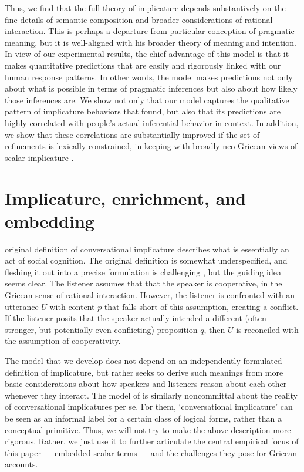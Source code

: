 \documentclass[leqno]{article}
\begin{document}
Thus, we find that the full theory of implicature depends
substantively on the fine details of semantic composition and broader
considerations of rational interaction. This is perhaps a departure
from  particular conception of pragmatic meaning,
but it is well-aligned with his broader theory of meaning and
intention.  In view of our experimental results, the chief advantage
of this model is that it makes quantitative predictions that are
easily and rigorously linked with our human response patterns. In
other words, the model makes predictions not only about what is
possible in terms of pragmatic inferences but also about how likely
those inferences are. We show not only that our model captures the
qualitative pattern of implicature behaviors that
\citeauthor{Chemla:Spector:2011} found, but also that its predictions
are highly correlated with people's actual inferential behavior in
context. In addition, we show that these correlations are
substantially improved if the set of refinements is lexically
constrained, in keeping with broadly neo-Gricean views of scalar
implicature \citep{Horn72,Gazdar79b,Gazdar79a,SchulzVanRooij06}.


\section{Implicature, enrichment, and embedding}\label{sec:implicature}

 original definition of conversational implicature
describes what is essentially an act of social cognition. The original
definition is somewhat underspecified, and fleshing it out into a
precise formulation is challenging \citep{Hirschberg85}, but the
guiding idea seems clear.  The listener assumes that that the speaker
is cooperative, in the Gricean sense of rational interaction. However,
the listener is confronted with an utterance $U$ with content $p$ that
falls short of this assumption, creating a conflict. If the listener
posits that the speaker actually intended a different (often stronger,
but potentially even conflicting) proposition $q$, then $U$ is
reconciled with the assumption of cooperativity.

The model that we develop does not depend on an independently
formulated definition of implicature, but rather seeks to derive such
meanings from more basic considerations about how speakers and
listeners reason about each other whenever they interact. The model of
\citet{ChierchiaFoxSpector08} is similarly noncommittal about the
reality of conversational implicatures per se. For them,
`conversational implicature' can be seen as an informal label for a
certain class of logical forms, rather than a conceptual
primitive. Thus, we will not try to make the above description more
rigorous. Rather, we just use it to further articulate the central
empirical focus of this paper --- embedded scalar terms --- and the
challenges they pose for Gricean accounts.
\end{document}

